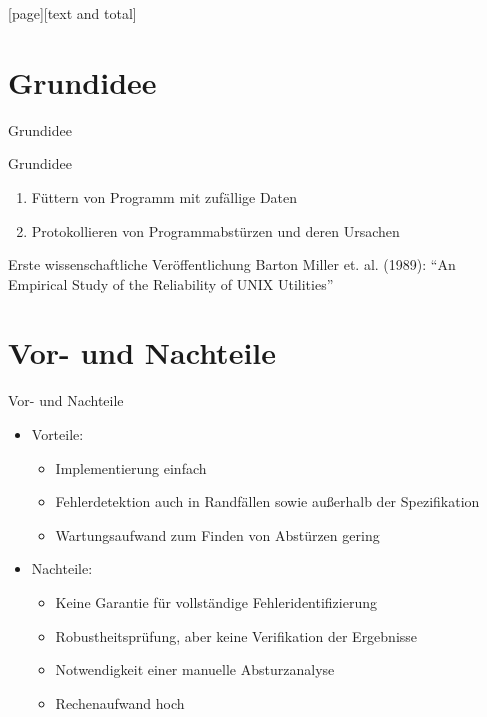 \documentclass[ngerman,aspectratio=1610,12pt]{beamer}
\title[Fuzzing]{Fuzzing\protect\\\mdseries Ein kurzer Überblick\strut}
\author{~}
\date{11. Januar 2019}
\begin{document}
\maketitle
{}[page][text and total]


\section{Grundidee}
\begin{frame}{Grundidee}
  \begin{block}{Grundidee}
      \begin{enumerate}
    \item Füttern von Programm mit zufällige Daten
    \item Protokollieren von  Programmabstürzen und deren Ursachen 
  \end{enumerate}
  \end{block}
 
  \begin{block}{Erste wissenschaftliche Veröffentlichung}
    Barton Miller et. al. (1989): "`An Empirical Study of the Reliability of UNIX Utilities"'
  \end{block}
\end{frame}


\section{Vor- und Nachteile}
\begin{frame}{Vor- und Nachteile}
  \begin{itemize}
    \item Vorteile:
    \begin{itemize}
      \item Implementierung einfach
      \item Fehlerdetektion auch in Randfällen sowie außerhalb der Spezifikation
      \item Wartungsaufwand zum Finden von Abstürzen gering
    \end{itemize}
    \item Nachteile:
    \begin{itemize}
      \item Keine Garantie für vollständige Fehleridentifizierung
      \item Robustheitsprüfung, aber keine Verifikation der Ergebnisse
      \item Notwendigkeit einer manuelle Absturzanalyse
      \item Rechenaufwand hoch
    \end{itemize}
  \end{itemize}
\end{frame}
\end{document}
